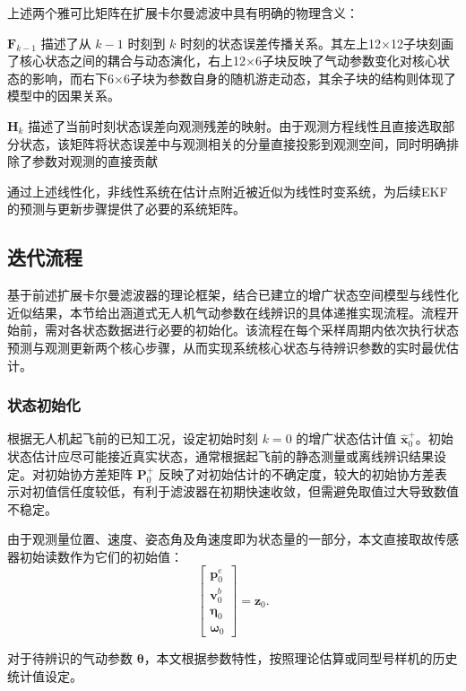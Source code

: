 上述两个雅可比矩阵在扩展卡尔曼滤波中具有明确的物理含义：

$\boldsymbol{F}_{k-1}$ 描述了从 $k-1$ 时刻到 $k$ 时刻的状态误差传播关系。其左上12×12子块刻画了核心状态之间的耦合与动态演化，右上12×6子块反映了气动参数变化对核心状态的影响，而右下6×6子块为参数自身的随机游走动态，其余子块的结构则体现了模型中的因果关系。

$\boldsymbol{H}_k$ 描述了当前时刻状态误差向观测残差的映射。由于观测方程线性且直接选取部分状态，该矩阵将状态误差中与观测相关的分量直接投影到观测空间，同时明确排除了参数对观测的直接贡献

通过上述线性化，非线性系统在估计点附近被近似为线性时变系统，为后续EKF的预测与更新步骤提供了必要的系统矩阵。

\subsection{迭代流程}
\label{sec:diedai}
基于前述扩展卡尔曼滤波器的理论框架，结合已建立的增广状态空间模型与线性化近似结果，本节给出涵道式无人机气动参数在线辨识的具体递推实现流程。流程开始前，需对各状态数据进行必要的初始化。该流程在每个采样周期内依次执行状态预测与观测更新两个核心步骤，从而实现系统核心状态与待辨识参数的实时最优估计。

\subsubsection{状态初始化}
    根据无人机起飞前的已知工况，设定初始时刻 $k=0$ 的增广状态估计值 $\hat{\boldsymbol{x}}_0^+$。初始状态估计应尽可能接近真实状态，通常根据起飞前的静态测量或离线辨识结果设定。对初始协方差矩阵 $\boldsymbol{P}_0^+$ 反映了对初始估计的不确定度，较大的初始协方差表示对初值信任度较低，有利于滤波器在初期快速收敛，但需避免取值过大导致数值不稳定。
    
    由于观测量位置、速度、姿态角及角速度即为状态量的一部分，本文直接取故传感器初始读数作为它们的初始值：
    \begin{equation}
        \begin{bmatrix}
            \boldsymbol{p}_0^e \\
            \boldsymbol{v}_0^b \\
            \boldsymbol{\eta}_0 \\
            \boldsymbol{\omega}_0
        \end{bmatrix} = 
        \boldsymbol{z}_0.
    \end{equation}

    对于待辨识的气动参数 $\boldsymbol{\theta}$，本文根据参数特性，按照理论估算或同型号样机的历史统计值设定。

